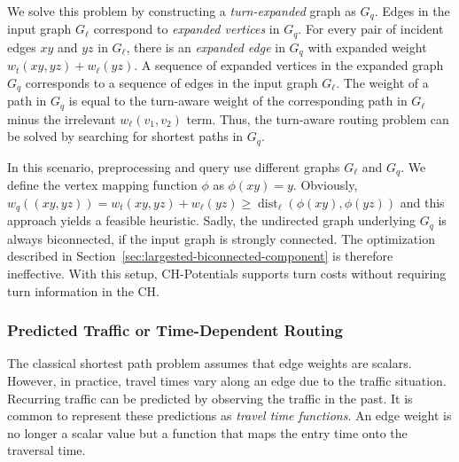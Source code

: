 \documentclass[manuscript,review]{acmart}
\newcommand*{\dist}{\operatorname{dist}}
\begin{document}
We solve this problem by constructing a \emph{turn-expanded} graph as $G_q$.
Edges in the input graph $G_\ell$ correspond to \emph{expanded vertices} in $G_q$.
For every pair of incident edges $x y$ and $y z$ in $G_\ell$, there is an \emph{expanded edge} in $G_q$ with expanded weight $w_t(xy,yz) + w_\ell(y z)$.
A sequence of expanded vertices in the expanded graph $G_q$ corresponds to a sequence of edges in the input graph $G_\ell$.
The weight of a path in $G_q$ is equal to the turn-aware weight of the corresponding path in $G_\ell$ minus the irrelevant $w_\ell(v_1,v_2)$ term.
Thus, the turn-aware routing problem can be solved by searching for shortest paths in $G_q$.

In this scenario, preprocessing and query use different graphs $G_\ell$ and $G_q$.
We define the vertex mapping function $\phi$ as $\phi(x y) = y$.
Obviously, $w_q((xy, yz)) = w_t(xy,yz) + w_\ell(y z) \geq \dist_\ell(\phi(x y), \phi(y z))$ and this approach yields a feasible heuristic.
Sadly, the undirected graph underlying $G_q$ is always biconnected, if the input graph is strongly connected.
The optimization described in Section~\ref{sec:largested-biconnected-component} is therefore ineffective.
With this setup, CH-Potentials supports turn costs without requiring turn information in the CH.


\subsubsection{Predicted Traffic or Time-Dependent Routing}
\label{sec:predicted-traffic}

The classical shortest path problem assumes that edge weights are scalars.
However, in practice, travel times vary along an edge due to the traffic situation.
Recurring traffic can be predicted by observing the traffic in the past.
It is common \cite{bgsv-mtdtt-13,bdpw-dtdrp-16,swz-sfert-21} to represent these predictions as \emph{travel time functions}.
An edge weight is no longer a scalar value but a function that maps the entry time onto the traversal time.
\end{document}

